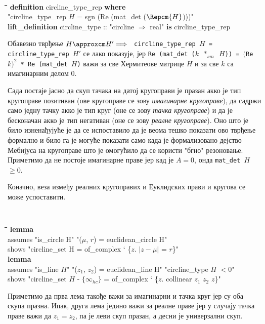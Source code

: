 {\tt
\begin{tabbing}
\hspace{5mm}\=\hspace{5mm}\=\hspace{5mm}\=\hspace{5mm}\=\hspace{5mm}\=\kill
{\bf definition} circline\_type\_rep {\bf where}\\
\>"circline\_type\_rep $H$ = sgn (Re (mat\_det ($\Repcm{H}$)))"\\
{\bf lift\_definition} circline\_type :: "circline $\Rightarrow$ real" {\bf is} circline\_type\_rep
\end{tabbing}
}
\noindent Обавезно тврђење $H \approxcm H' \Longrightarrow$ {\tt
  circline\_type\_rep $H$ = circline\_type\_rep $H'$} се лако
показује, јер {\tt Re (mat\_det ($k$ $*_{sm}$ $H$)) = $($Re $k)^2$ *
  Re (mat\_det $H$)} важи за све Хермитеове матрице $H$ и за све $k$
са имагинарним делом $0$.

Сада постаје јасно да скуп тачака на датој кругоправи је празан акко
је тип кругоправе позитиван (ове кругоправе се зову \emph{ имагинарне
  кругоправе}), да садржи само једну тачку акко је тип круг (оне се
зову \emph{тачка кругоправе}) и да је бесконачан акко је тип негативан
(оне се зову \emph{реалне кругоправе}).  Оно што је било изненађујуће
је да се испоставило да је веома тешко показати ово тврђење формално и
било га је могуће показати само када је формализовано дејство Мебијуса
на кругоправе што је омогућило да се користи "бгно"
резоновање. Приметимо да не постоје имагинарне праве јер кад је $A =
0$, онда {\tt mat\_det $H$ $\ge 0$}.

Коначно, веза између реалних кругоправих и Еуклидских прави и кругова
се може успоставити.

{\tt
\begin{tabbing}
\hspace{5mm}\=\hspace{5mm}\=\hspace{5mm}\=\hspace{5mm}\=\hspace{5mm}\=\kill
{\bf lemma}\\
\> assumes "is\_circle H" "($\mu$, $r$) = euclidean\_circle H"\\
\>  shows "circline\_set H = of\_complex ` \{$z.$ $|z-\mu|$ = $r$\}"\\
{\bf lemma}\\
\>  assumes "is\_line $H$" "($z_1$, $z_2$) = euclidean\_line H" "circline\_type $H$ $< 0$"\\
\>  shows "circline\_set $H$ - $\{\infty_{hc}\}$ = of\_complex ` \{$z$. collinear $z_1$ $z_2$ $z$\}"
\end{tabbing}
}
\noindent Приметимо да прва лема такође важи за имагинарни и тачка
круг јер су оба скупа празна. Ипак, друга лема једино важи за реалне
праве јер у случају тачка праве важи да $z_1=z_2$, па је леви скуп
празан, а десни је универзални скуп.

